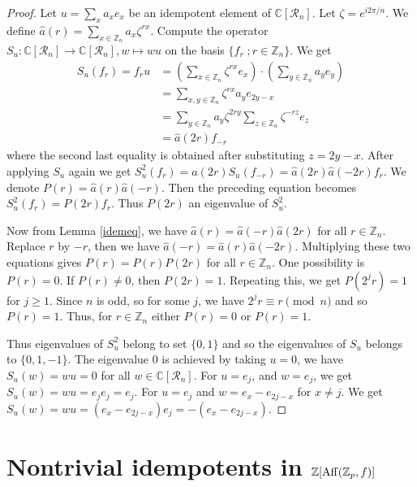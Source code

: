 \documentclass[10pt,twoside,reqno]{amsart}
\theoremstyle{definition}
\numberwithin{equation}{section}
\begin{document}
\begin{proof}
Let $u=\sum\limits_{x}a_xe_x$ be an idempotent element of $\mathbb C[\mathcal R_n]$. Let $\zeta=e^{i2\pi/n}$. We define $\hat{a}(r)=\sum\limits_{x\in \mathbb Z_n}a_x\zeta^{rx}$.
Compute the operator $S_u: \mathbb C[\mathcal R_n] \rightarrow \mathbb C[\mathcal R_n], w \mapsto wu$ on the basis $\{f_r\;; r\in \mathbb Z_n\}$.
We get
\begin{align*}
S_u(f_r)=f_ru&=\left( \sum\limits_{x\in \mathbb Z_n}\zeta^{rx}e_x \right) \cdot \left( \sum\limits_{y\in \mathbb Z_n}a_ye_y\right)\\
&=\sum\limits_{x,y\in \mathbb Z_n}\zeta^{rx}a_ye_{2y-x}\\
&=\sum\limits_{y\in \mathbb Z_n}a_y\zeta^{2ry} \sum\limits_{z\in \mathbb Z_n}\zeta^{-rz}e_z\\
&=\hat{a}(2r)f_{-r}
\end{align*}
where the second last equality is obtained after substituting $z=2y-x$. After applying $S_u$ again we get $S_u^{2}(f_r)=\hat{a}(2r)S_u(f_{-r})=\hat{a}(2r)\hat{a}(-2r)f_r$. We denote $P(r)=\hat{a}(r)\hat{a}(-r)$. Then the preceding equation becomes $S^2_u(f_r)=P(2r)f_r$.
Thus $P(2r)$ an eigenvalue of $S^2_u$. 

Now from Lemma \ref{idemeq}, we have $\hat{a}(r)=\hat{a}(-r)\hat{a}(2r)$ for all $r\in \mathbb Z_n$. Replace $r$ by $-r$, then we have $\hat{a}(-r)=\hat{a}(r)\hat{a}(-2r)$. Multiplying these two equations gives $P(r)=P(r)P(2r)$ for all $r\in \mathbb Z_n$. One possibility is $P(r)=0$. If $P(r)\neq 0$, then $P(2r)=1$. Repeating this, we get $P(2^jr)=1$ for $j\geq 1$. Since $n$ is odd, so for some $j$, we have $2^jr\equiv r \pmod n$ and so $P(r)=1$. Thus, for $r\in \mathbb Z_n$ either $P(r)=0$ or $P(r)=1$.

Thus eigenvalues of $S_u^2$ belong to set $\{0,1\}$ and so the eigenvalues of $S_u$ belongs to $\{0,1,-1\}$. The eigenvalue $0$ is achieved by taking $u=0$, we have $S_u(w)=wu=0$ for all $w\in \mathbb{C}[\mathcal R_n]$. For $u=e_j$, and $w=e_j$, we get $S_u(w)=wu=e_je_j=e_j$. For $u=e_j$ and $w=e_x-e_{2j-x}$ for $x\neq j$. We get $S_u(w)=wu=(e_{x}-e_{2j-x})e_j=-(e_x-e_{2j-x})$.


\end{proof}

\section{Nontrivial idempotents in $\mathbb Z[{\rm Aff}(\mathbb Z_p,f)]$}\label{sec4}
\end{document}
